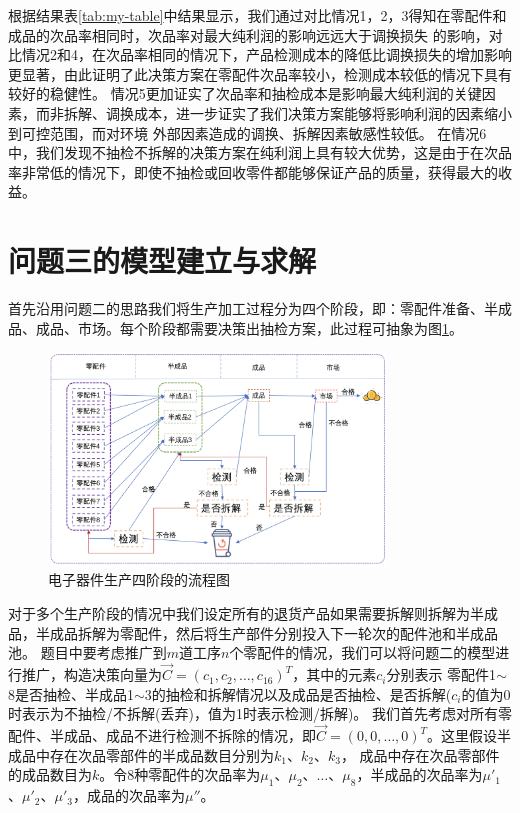 \documentclass[withoutpreface,bwprint]{cumcmthesis} %
\begin{document}
根据结果表\ref{tab:my-table}中结果显示，我们通过对比情况1，2，3得知在零配件和成品的次品率相同时，次品率对最大纯利润的影响远远大于调换损失
的影响，对比情况2和4，在次品率相同的情况下，产品检测成本的降低比调换损失的增加影响更显著，由此证明了此决策方案在零配件次品率较小，检测成本较低的情况下具有较好的稳健性。
情况5更加证实了次品率和抽检成本是影响最大纯利润的关键因素，而非拆解、调换成本，进一步证实了我们决策方案能够将影响利润的因素缩小到可控范围，而对环境
外部因素造成的调换、拆解因素敏感性较低。
在情况6中，我们发现不抽检不拆解的决策方案在纯利润上具有较大优势，这是由于在次品率非常低的情况下，即使不抽检或回收零件都能够保证产品的质量，获得最大的收益。

\section{问题三的模型建立与求解}
首先沿用问题二的思路我们将生产加工过程分为四个阶段，即：零配件准备、半成品、成品、市场。每个阶段都需要决策出抽检方案，此过程可抽象为图\ref{fig:pro3-1}。
\begin{figure}[H]
	\centering
	\includegraphics[width=0.8\textwidth]{Fig/pro3-1.png}
	\caption{电子器件生产四阶段的流程图}
	\label{fig:pro3-1}
\end{figure}
对于多个生产阶段的情况中我们设定所有的退货产品如果需要拆解则拆解为半成品，半成品拆解为零配件，然后将生产部件分别投入下一轮次的配件池和半成品池。
题目中要考虑推广到$m$道工序$n$个零配件的情况，我们可以将问题二的模型进行推广，构造决策向量为$\vec{C}=(c_{1},c_{2},\dots,c_{16})^{T}$，其中的元素$c_i$分别表示
零配件1$\sim$8是否抽检、半成品1$\sim$3的抽检和拆解情况以及成品是否抽检、是否拆解($c_{i}$的值为0时表示为不抽检/不拆解(丢弃)，值为1时表示检测/拆解)。
我们首先考虑对所有零配件、半成品、成品不进行检测不拆除的情况，即$\vec{C}=(0,0,\dots,0)^{T}$。这里假设半成品中存在次品零部件的半成品数目分别为$k_{1}$、$k_{2}$、$k_{3}$，
成品中存在次品零部件的成品数目为$k$。令8种零配件的次品率为$\mu_{1}$、$\mu_{2}$、$\dots$、$\mu_{8}$，半成品的次品率为$\mu'_{1}$、$\mu'_{2}$、$\mu'_{3}$，成品的次品率为$\mu''$。
\end{document}

